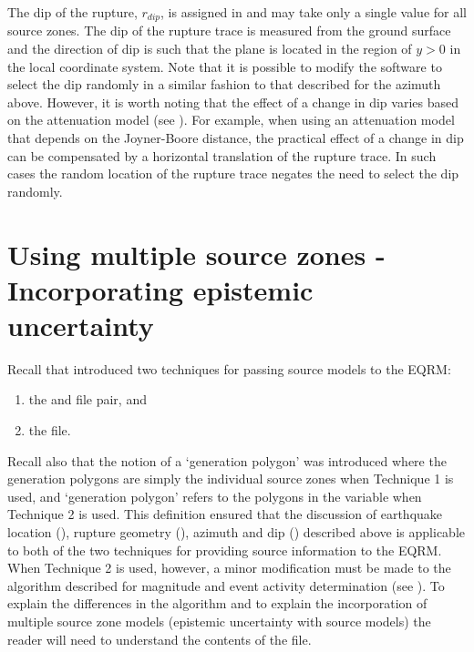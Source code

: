 The dip of the rupture, $r_{dip}$, is assigned in
 and may take only a single value for all
source zones. The dip of the rupture trace is measured from the
ground surface and the direction of dip is such that the plane is
located in the region of $y>0$ in the local coordinate system.
Note that it is
 possible to modify the software to select the dip randomly in a similar fashion to that
 described for the azimuth above. However, it is worth noting that
 the effect of a change in dip varies based on the attenuation model (see ). For example, when using an attenuation model that depends on the Joyner-Boore distance, the practical effect
 of a change in dip can be compensated by a
 horizontal translation of the rupture trace. In such cases the random
 location of the rupture trace negates the need to select the dip
 randomly.

\section{Using multiple source zones - Incorporating epistemic uncertainty}
\label{sec:source-multizones}

Recall that  introduced two techniques for
passing source models to the EQRM:
\begin{enumerate}
\item the
 and
 file pair,
and \item the
 file.
\end{enumerate}
Recall also that the notion of a `generation
polygon' was introduced where the
generation polygons are simply the individual source zones when
Technique 1 is used, and `generation polygon' refers to the
polygons in the  variable when Technique 2
is used. This definition ensured that the discussion of earthquake
location (), rupture geometry
(), azimuth and dip
() described above is applicable to both
of the two techniques for providing source information to the
EQRM. When Technique 2 is used, however, a minor modification must
be made to the algorithm described for magnitude and event
activity determination (see ). To
explain the differences in the algorithm and to explain the
incorporation of multiple source zone models (epistemic
uncertainty with source models) the reader will need to understand
the contents of the
 file.

